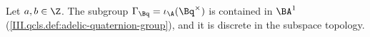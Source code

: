 Let $a,b\in\Z$. The subgroup $\Gamma_{\Bq}=\iota_\A(\Bq^\times)$ is contained in $\BA^1$ (\cref{III.qcls.def:adelic-quaternion-group}), and it is discrete in the subspace topology.
